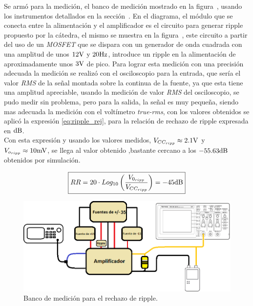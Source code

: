 Se armó para la medición, el banco de medición mostrado en la figura~, usando los instrumentos detallados en la sección~. En el diagrama, el módulo que se conecta entre la alimentación y el amplificador es el circuito para generar ripple propuesto por la cátedra, el mismo se muestra en la figura~, este circuito a partir del uso de un \textit{MOSFET} que se dispara con un generador de onda cuadrada con una amplitud de unos $12 \si[per-mode=symbol]{\volt}$ y $20 \si[per-mode=symbol]{\hertz}$, introduce un ripple en la alimentación de aproximadamente unos $3 \si[per-mode=symbol]{\volt}$ de pico. Para lograr esta medición con una precisión adecuada la medición se realizó con el osciloscopio para la entrada, que sería el valor \textit{RMS} de la señal montada sobre la continua de la fuente, ya que esta tiene una amplitud apreciable, usando la medición de valor \textit{RMS} del osciloscopio, se pudo medir sin problema, pero para la salida, la señal es muy pequeña, siendo mas adecuada la medición con el voltímetro \textit{true-rms}, con los valores obtenidos se aplicó la expresión \eqref{eq:ripple_rej}, para la relación de rechazo de ripple expresada en $\si[per-mode=symbol]{\decibel}$.\\
Con esta expresión y usando los valores medidos, $V_{CC_{ripp}} \approx 2.1 \si[per-mode=symbol]{\volt}$ y $V_{o_{ripp}} \approx 10 \si[per-mode=symbol]{\milli\volt}$, se llega al valor obtenido ,bastante cercano a los $-55.63 \si[per-mode=symbol]{\decibel}$ obtenidos por simulación.

\begin{equation}
\boxed{ RR = 20 \cdot Log_{10} \left(  \frac{V_{0_{ripp}}}{V_{CC_{ripp}}} \right) = -45 \si[per-mode=symbol]{\decibel}}
\label{eq:ripple_rej}
\end{equation}


\vfill


\clearpage


\begin{figure}[H]
    \centering
    \includegraphics[width= 0.8 \textwidth]{./img/bancos/banco_Ripple.png}
    \caption{Banco de medición para el rechazo de ripple.}
    \label{fig:banco_ripple}
\end{figure}



